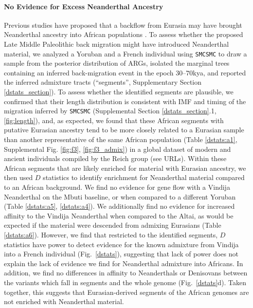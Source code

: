 \documentclass{article}
\begin{document}
\paragraph{No Evidence for Excess Neanderthal Ancestry} Previous studies have proposed that a backflow from Eurasia may have brought Neanderthal ancestry into African populations \cite{Chen2020}. To assess whether the proposed Late Middle Paleolithic back migration might have introduced Neanderthal material, we analyzed a Yoruban and a French individual using {\tt SMCSMC} to draw a sample from the posterior distribution of ARGs, isolated the marginal trees containing an inferred back-migration event in the epoch $30$--$70$kya, and reported the inferred admixture tracts (``segments'', Supplementary Section \ref{dstats_section}). To assess whether the identified segments are plausible, we confirmed that their length distribution is consistent with IMF and timing of the migration inferred by {\tt SMCSMC} (Supplemental Section \ref{dstats_section}.1, \ref{fig:length}), and, as expected, we found that these African segments with putative Eurasian ancestry tend to be more closely related to a Eurasian sample than another representative of the same African population (Table \ref{dstats:a1}, Supplemental Fig. \ref{fig:f3}, \ref{fig:f3_admix}) in a global dataset of modern and ancient individuals compiled by the Reich group (see URLs). Within these African segments that are likely enriched for material with Eurasian ancestry, we then used $D$ statistics \cite{Patterson2012} to identify enrichment for Neanderthal material compared to an African background. We find no evidence for gene flow with a Vindija Neanderthal on the Mbuti baseline, or when compared to a different Yoruban (Table \ref{dstats:a5}, \ref{dstats:a4}). We additionally find no evidence for increased affinity to the Vindija Neanderthal when compared to the Altai, as would be expected if the material were descended from admixing Eurasians (Table \ref{dstats:a6}). However, we find that restricted to the identified segments, $D$ statistics have power to detect evidence for the known admixture from Vindija into a French individual (Fig.\ \ref{dstats}), suggesting that lack of power does not explain the lack of evidence we find for Neanderthal admixture into Africans.  In addition, we find no differences in affinity to Neanderthals or Denisovans between the variants which fall in segments and the whole genome (Fig.\ \ref{dstats}d). Taken together, this suggests that Eurasian-derived segments of the African genomes are not enriched with Neanderthal material.
\end{document}
